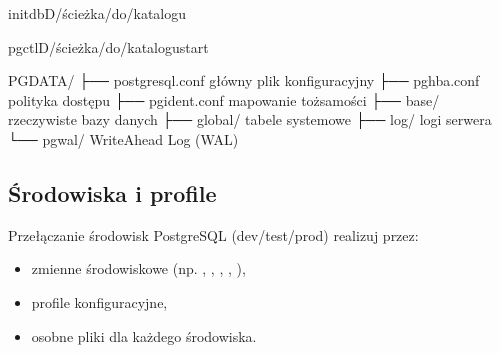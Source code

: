 \documentclass[letterpaper,10pt,english]{sphinxmanual}
\begin{document}
\sphinxAtStartPar
{}

\begin{sphinxVerbatim}[commandchars=\\\{\}]
initdb\PYGZhy{}D/ścieżka/do/katalogu

pg\PYGZus{}ctl\PYGZhy{}D/ścieżka/do/katalogustart
\end{sphinxVerbatim}

\sphinxAtStartPar
{}

\begin{sphinxVerbatim}[commandchars=\\\{\}]
\PYGZdl{}PGDATA/
├── postgresql.conf   \PYGZsh{} główny plik konfiguracyjny
├── pg\PYGZus{}hba.conf       \PYGZsh{} polityka dostępu
├── pg\PYGZus{}ident.conf     \PYGZsh{} mapowanie tożsamości
├── base/             \PYGZsh{} rzeczywiste bazy danych
├── global/           \PYGZsh{} tabele systemowe
├── log/              \PYGZsh{} logi serwera
└── pg\PYGZus{}wal/           \PYGZsh{} Write\PYGZhy{}Ahead Log (WAL)
\end{sphinxVerbatim}

\sphinxAtStartPar
{}

\begin{sphinxVerbatim}[commandchars=\\\{\}]
\end{sphinxVerbatim}


\subsection{Środowiska i profile}
\label{\detokenize{rozdzial_2/rozdzial_22/index:srodowiska-i-profile}}
\sphinxAtStartPar
Przełączanie środowisk PostgreSQL (dev/test/prod) realizuj przez:
\begin{itemize}
\item {} 
\sphinxAtStartPar
zmienne środowiskowe (np. , , , , ),

\item {} 
\sphinxAtStartPar
profile konfiguracyjne,

\item {} 
\sphinxAtStartPar
osobne pliki  dla każdego środowiska.

\end{itemize}
\end{document}
